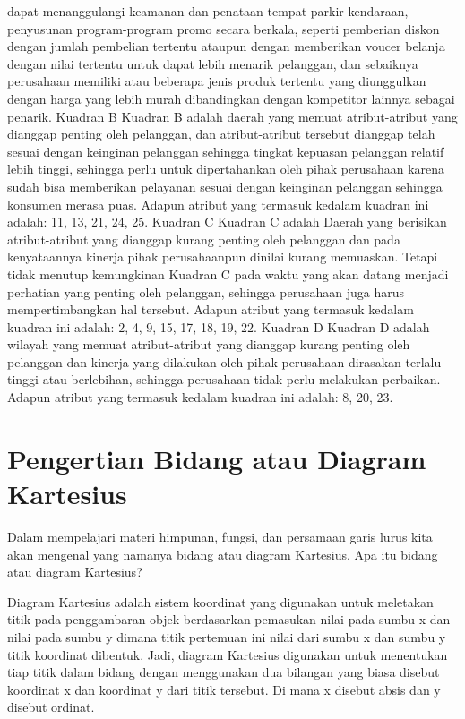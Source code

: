 dapat menanggulangi keamanan dan penataan tempat parkir kendaraan, penyusunan program-program promo secara berkala, seperti pemberian diskon dengan jumlah pembelian tertentu ataupun dengan
memberikan voucer belanja dengan nilai tertentu untuk dapat lebih menarik pelanggan, dan sebaiknya perusahaan memiliki atau beberapa jenis produk tertentu
yang diunggulkan dengan harga yang lebih murah dibandingkan dengan kompetitor lainnya sebagai penarik.
Kuadran B
Kuadran B adalah daerah yang memuat atribut-atribut yang dianggap penting oleh pelanggan, dan atribut-atribut tersebut dianggap telah sesuai dengan keinginan
pelanggan sehingga tingkat kepuasan pelanggan relatif lebih tinggi, sehingga perlu untuk dipertahankan oleh pihak perusahaan karena sudah bisa memberikan pelayanan
sesuai dengan keinginan pelanggan sehingga konsumen merasa puas. Adapun atribut yang termasuk kedalam kuadran ini adalah: 11, 13, 21, 24, 25.
Kuadran C
Kuadran C adalah Daerah yang berisikan atribut-atribut yang dianggap kurang penting oleh pelanggan dan pada kenyataannya kinerja pihak perusahaanpun dinilai kurang memuaskan. Tetapi tidak
menutup kemungkinan Kuadran C pada waktu yang akan datang menjadi perhatian yang penting oleh pelanggan, sehingga perusahaan juga harus mempertimbangkan
hal tersebut. Adapun atribut yang termasuk kedalam kuadran ini adalah: 2, 4, 9, 15, 17, 18, 19, 22.
Kuadran D
Kuadran D adalah wilayah yang memuat atribut-atribut yang dianggap kurang penting oleh pelanggan dan kinerja yang dilakukan oleh pihak perusahaan dirasakan
terlalu tinggi atau berlebihan, sehingga perusahaan tidak perlu melakukan perbaikan. Adapun atribut yang termasuk kedalam kuadran ini adalah: 8, 20, 23.

\section{Pengertian Bidang atau Diagram Kartesius}

Dalam mempelajari materi himpunan, fungsi, dan persamaan garis lurus kita akan mengenal yang namanya bidang atau diagram Kartesius. Apa itu bidang atau diagram Kartesius?

Diagram Kartesius adalah sistem koordinat yang digunakan untuk meletakan titik pada penggambaran objek berdasarkan pemasukan nilai pada sumbu x dan nilai pada sumbu y dimana titik pertemuan ini nilai dari sumbu x dan sumbu y titik koordinat dibentuk. Jadi, diagram Kartesius digunakan untuk menentukan tiap titik dalam bidang dengan menggunakan dua bilangan yang biasa disebut koordinat x dan koordinat y dari titik tersebut. Di mana x disebut absis dan y disebut ordinat.

